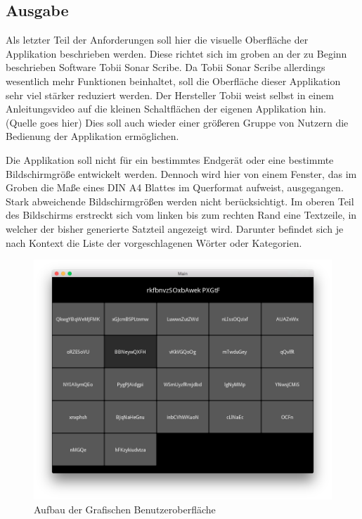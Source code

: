         
    \newpage
	\subsection{Ausgabe}
        
        Als letzter Teil der Anforderungen soll hier die visuelle Oberfläche der Applikation beschrieben werden. Diese richtet sich im groben an der zu Beginn beschrieben Software Tobii Sonar Scribe. Da Tobii Sonar Scribe allerdings wesentlich mehr Funktionen beinhaltet, soll die Oberfläche dieser Applikation sehr viel stärker reduziert werden. Der Hersteller Tobii weist selbst in einem Anleitungsvideo auf die kleinen Schaltflächen der eigenen Applikation hin. (Quelle goes hier) Dies soll auch wieder einer größeren Gruppe von Nutzern die Bedienung der Applikation ermöglichen.
        
        Die Applikation soll nicht für ein bestimmtes Endgerät oder eine bestimmte Bildschirmgröße entwickelt werden. Dennoch wird hier von einem Fenster, das im Groben die Maße eines DIN A4 Blattes im Querformat aufweist, ausgegangen. Stark abweichende Bildschirmgrößen werden nicht berücksichtigt. Im oberen Teil des Bildschirms erstreckt sich vom linken bis zum rechten Rand eine Textzeile, in welcher der bisher generierte Satzteil angezeigt wird. Darunter befindet sich je nach Kontext die Liste der vorgeschlagenen Wörter oder Kategorien.
        
		\begin{figure}[H]
    		\centering
    		\includegraphics[width=15cm]{images/UI-Model.png}
    		\caption[Aufbau der Grafischen Benutzeroberfläche]{Aufbau der Grafischen Benutzeroberfläche}
    		\label{img:GUIBase}
		\end{figure}
        
